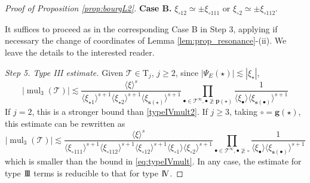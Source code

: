 \documentclass[a4paper,
11pt,  reqno]{amsart}
\newcommand{\jap}[1]{\langle #1 \rangle}
\newcommand{\III}{\textup{I \hspace{-2.9mm} I \hspace{-2.9mm} I}}
\newcommand{\IV}{\textup{I \hspace{-2.9mm} V}}
\newcommand{\5}{\textup{V}}
\newcommand{\noi}{\noindent}
\newcommand{\ind}{\mathbbm 1}
\theoremstyle{remark}
\newcommand{\bul}{\bullet}
\newcommand{\TT}{\mathcal{T}}
\newcommand{\Tr}{\mathrm{T}}
\newcommand{\pb}{\mathbf{p}}
\newcommand{\gb}{\mathbf{g}}
\newcommand{\sbf}{\mathbf{s}}
\DeclareMathOperator{\mul}{mul}
\numberwithin{equation}{section}
\numberwithin{theorem}{section}
\begin{document}
\begin{proof}[Proof of Proposition \ref{prop:bourgL2}]
\smallskip
\noi
\textbf{Case B.} $\xi_{\circ12}\simeq \pm \xi_{\circ111}$ or $\xi_{\circ2}\simeq \pm \xi_{\circ112}$.

\noi It suffices to proceed as in the corresponding Case B in Step 3, applying if necessary the change of coordinates of Lemma \ref{lem:prop_resonance}-(ii). We leave the details to the interested reader.


\smallskip
\noi\textit{Step 5. Type III estimate.} Given $\TT\in \Tr_j$, $j\ge 2$, since $|\Psi_E(\star)|\lesssim |\xi_\star|$,
$$
|\mul_3(\TT)|\lesssim \frac{\jap{\xi}^{s}}{\jap{\xi_{\star1}}^{s+1}\jap{\xi_{\star2}}^{s+1}\jap{\xi_{\sbf(\star)}}^{s+1}}\prod_{\bul \in \TT^\infty, \bul\ngeq \pb(\star)}\frac{1}{\jap{\xi_{\bul}}\jap{\xi_{\sbf(\bul)}}^{s+1}}
$$
If $j=2$, this is a stronger bound than \eqref{typeIVmult2}.
If $j\ge 3$, taking $\circ=\gb(\star)$, this estimate can be rewritten as
$$
|\mul_3(\TT)|\lesssim \frac{\jap{\xi}^s}{\jap{\xi_{\circ111}}^{s+1}\jap{\xi_{\circ112}}^{s+1}\jap{\xi_{\circ12}}^{s+1}\jap{\xi_{\circ1}}\jap{\xi_{\circ2}}^{s+1}} \prod_{\bul \in \TT^\infty, \bul\ngeq \circ}\frac{1}{\jap{\xi_{\bul}}\jap{\xi_{\sbf(\bul)}}^{s+1}}
$$
which is smaller than the bound in \eqref{eq:typeIVmult}. In any case, the estimate for type $\III$ terms is reducible to that for type $\IV$.







\end{proof}
\end{document}
